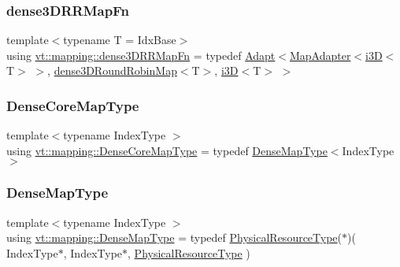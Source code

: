 \subsubsection{\texorpdfstring{dense3\+D\+R\+R\+Map\+Fn}{dense3DRRMapFn}}
{\footnotesize\ttfamily template$<$typename T  = Idx\+Base$>$ \\
using \hyperlink{namespacevt_1_1mapping_adb1f9b4ca3e67e3b47ca1a562f656217}{vt\+::mapping\+::dense3\+D\+R\+R\+Map\+Fn} = typedef \hyperlink{namespacevt_1_1mapping_aafe187035ce8df02f31983e37cdb6a5d}{Adapt}$<$\hyperlink{namespacevt_1_1mapping_a41b113c28bb6430fbcb5be66e08ccf9f}{Map\+Adapter}$<$\hyperlink{namespacevt_1_1mapping_af435b967b9ed1ccb5ec4effdbd9abd13}{i3D}$<$T$>$ $>$, \hyperlink{namespacevt_1_1mapping_aa48fa3b830b637787c584dbac5bba6db}{dense3\+D\+Round\+Robin\+Map}$<$T$>$, \hyperlink{namespacevt_1_1mapping_af435b967b9ed1ccb5ec4effdbd9abd13}{i3D}$<$T$>$ $>$}

\mbox{\label{namespacevt_1_1mapping_ac198c707792d29c7e3106fb89c3f3f92}} 
\subsubsection{\texorpdfstring{Dense\+Core\+Map\+Type}{DenseCoreMapType}}
{\footnotesize\ttfamily template$<$typename Index\+Type $>$ \\
using \hyperlink{namespacevt_1_1mapping_ac198c707792d29c7e3106fb89c3f3f92}{vt\+::mapping\+::\+Dense\+Core\+Map\+Type} = typedef \hyperlink{namespacevt_1_1mapping_a64f0fc107b569bb6644f1b015c6e7ad8}{Dense\+Map\+Type}$<$Index\+Type$>$}

\mbox{\label{namespacevt_1_1mapping_a64f0fc107b569bb6644f1b015c6e7ad8}} 
\subsubsection{\texorpdfstring{Dense\+Map\+Type}{DenseMapType}}
{\footnotesize\ttfamily template$<$typename Index\+Type $>$ \\
using \hyperlink{namespacevt_1_1mapping_a64f0fc107b569bb6644f1b015c6e7ad8}{vt\+::mapping\+::\+Dense\+Map\+Type} = typedef \hyperlink{namespacevt_a2dc36fcada816dc6d11774d650328ee9}{Physical\+Resource\+Type}($\ast$)( Index\+Type$\ast$, Index\+Type$\ast$, \hyperlink{namespacevt_a2dc36fcada816dc6d11774d650328ee9}{Physical\+Resource\+Type} )}

